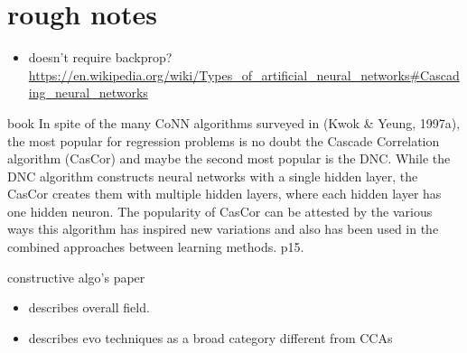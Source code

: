\documentclass{beamer}
\begin{document}
\section{rough notes}
\label{sec:orgb0e1b95}
\begin{itemize}
\item doesn't require backprop? \url{https://en.wikipedia.org/wiki/Types\_of\_artificial\_neural\_networks\#Cascading\_neural\_networks}
\end{itemize}

\begin{frame}[label={sec:orgc434aa2}]{book}
  In spite of the many CoNN algorithms surveyed in (Kwok \& Yeung, 1997a), the most popular for regression problems is no doubt the Cascade Correlation algorithm (CasCor) and maybe the second most popular is the DNC. While the DNC algorithm constructs neural networks with a single hidden layer, the CasCor creates them with multiple hidden layers, where each hidden layer has one hidden neuron. The popularity of CasCor can be attested by the various ways this algorithm has inspired new variations and also has been used in the combined approaches between learning methods. p15.
\end{frame}
\begin{frame}[label={sec:org52ba181}]{constructive algo's paper}
\begin{itemize}
\item describes overall field.
\item describes evo techniques as a broad category different from CCAs
\end{itemize}
\end{frame}
\end{document}
